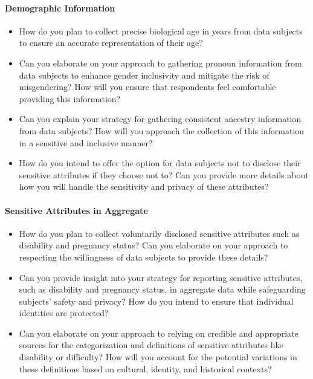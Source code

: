 \paragraph{Demographic Information}
\begin{itemize}
  \item How do you plan to collect precise biological age in years from data subjects
  to ensure an accurate representation of their age?
  \item Can you elaborate on your approach to gathering pronoun information from data
  subjects to enhance gender inclusivity and mitigate the risk of misgendering? How
  will you ensure that respondents feel comfortable providing this information?
  \item Can you explain your strategy for gathering consistent ancestry information
  from data subjects? How will you approach the collection of this information in a
  sensitive and inclusive manner?
  \item How do you intend to offer the option for data subjects not to disclose their
  sensitive attributes if they choose not to? Can you provide more details about how
  you will handle the sensitivity and privacy of these attributes?
\end{itemize}

\paragraph{Sensitive Attributes in Aggregate}
\begin{itemize}
  \item How do you plan to collect voluntarily disclosed sensitive attributes such as
  disability and pregnancy status? Can you elaborate on your approach to respecting the
  willingness of data subjects to provide these details?
  \item Can you provide insight into your strategy for reporting sensitive attributes,
  such as disability and pregnancy status, in aggregate data while safeguarding
  subjects' safety and privacy? How do you intend to ensure that individual identities
  are protected?
  \item Can you elaborate on your approach to relying on credible and appropriate
  sources for the categorization and definitions of sensitive attributes like
  disability or difficulty? How will you account for the potential variations in
  these definitions based on cultural, identity, and historical contexts?
\end{itemize}


